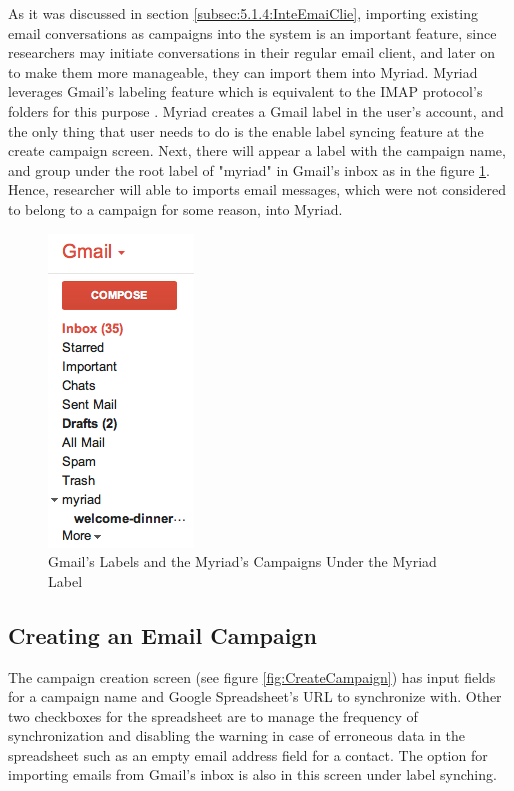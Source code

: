 As it was discussed in section \ref{subsec:5.1.4:InteEmaiClie}, importing existing email conversations as campaigns into the system is an important feature, since researchers may initiate conversations in their regular email client, and later on to make them more manageable, they can import them into Myriad. Myriad leverages Gmail's labeling feature which is equivalent to the \ac{IMAP} protocol's folders for this purpose \citep{GoogleInc.2013}. Myriad creates a Gmail label in the user's account, and the only thing that user needs to do is the enable label syncing feature at the create campaign screen. Next, there will appear a label with the campaign name, and group under the root label of "myriad" in Gmail's inbox as in the figure \ref{fig:GmailLabels}. Hence, researcher will able to imports email messages, which were not considered to belong to a campaign for some reason, into Myriad.

\begin{figure}[htbp]
	\centering
	\includegraphics[scale=0.60]{imgs/GmailLabels.png}
	\caption[Gmail's Labels and the Myriad's Campaigns Under the Myriad Label]{Gmail's Labels and the Myriad's Campaigns Under the Myriad Label}
	\label{fig:GmailLabels}
\end{figure}

\subsection{Creating an Email Campaign}
\label{subsec:5.2.3:CreaEmaiCamp}

The campaign creation screen (see figure \ref{fig:CreateCampaign}) has input fields for a campaign name and Google Spreadsheet's URL to synchronize with. Other two checkboxes for the spreadsheet are to manage the frequency of synchronization and disabling the warning in case of erroneous data in the spreadsheet such as an empty email address field for a contact. The option for importing emails from Gmail's inbox is also in this screen under label synching.

